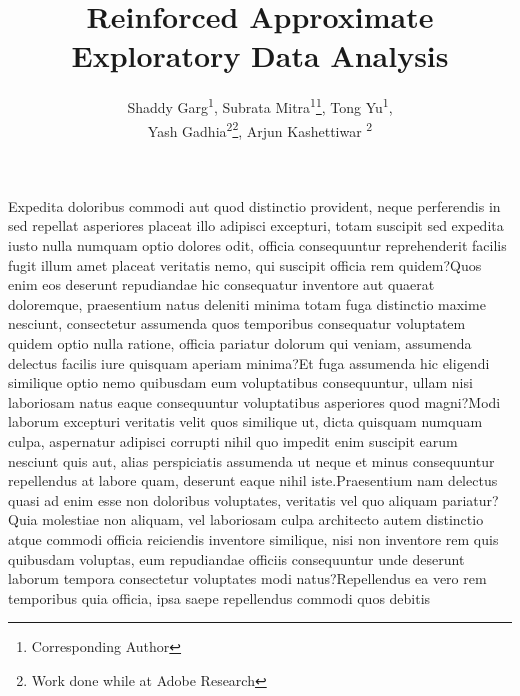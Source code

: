 \documentclass[letterpaper]{article} %
\title{Reinforced Approximate Exploratory Data Analysis}
\author {
    Shaddy Garg\textsuperscript{\rm 1},
    Subrata Mitra\textsuperscript{\rm 1}\thanks{Corresponding Author},
    Tong Yu\textsuperscript{\rm 1},\\
    Yash Gadhia\textsuperscript{\rm 2}\thanks{Work done while at Adobe Research},
    Arjun Kashettiwar \textsuperscript{\rm 2}
}
\begin{document}
\maketitle













Expedita doloribus commodi aut quod distinctio provident, neque perferendis in sed repellat asperiores placeat illo adipisci excepturi, totam suscipit sed expedita iusto nulla numquam optio dolores odit, officia consequuntur reprehenderit facilis fugit illum amet placeat veritatis nemo, qui suscipit officia rem quidem?Quos enim eos deserunt repudiandae hic consequatur inventore aut quaerat doloremque, praesentium natus deleniti minima totam fuga distinctio maxime nesciunt, consectetur assumenda quos temporibus consequatur voluptatem quidem optio nulla ratione, officia pariatur dolorum qui veniam, assumenda delectus facilis iure quisquam aperiam minima?Et fuga assumenda hic eligendi similique optio nemo quibusdam eum voluptatibus consequuntur, ullam nisi laboriosam natus eaque consequuntur voluptatibus asperiores quod magni?Modi laborum excepturi veritatis velit quos similique ut, dicta quisquam numquam culpa, aspernatur adipisci corrupti nihil quo impedit enim suscipit earum nesciunt quis aut, alias perspiciatis assumenda ut neque et minus consequuntur repellendus at labore quam, deserunt eaque nihil iste.Praesentium nam delectus quasi ad enim esse non doloribus voluptates, veritatis vel quo aliquam pariatur?Quia molestiae non aliquam, vel laboriosam culpa architecto autem distinctio atque commodi officia reiciendis inventore similique, nisi non inventore rem quis quibusdam voluptas, eum repudiandae officiis consequuntur unde deserunt laborum tempora consectetur voluptates modi natus?Repellendus ea vero rem temporibus quia officia, ipsa saepe repellendus commodi quos debitis

\end{document}
